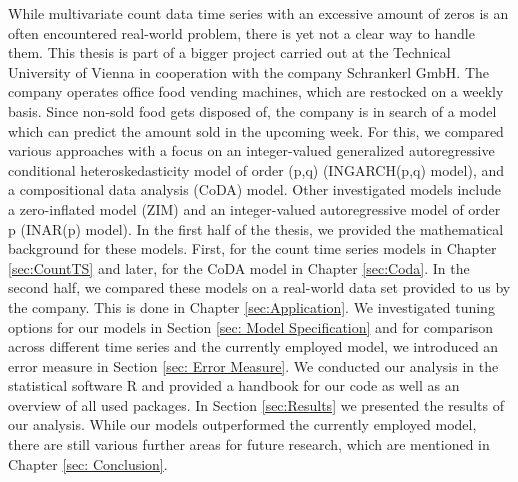 While multivariate count data time series with an excessive amount of zeros is an often encountered real-world problem, there is yet not a clear way to handle them. This thesis is part of a bigger project carried out at the Technical University of Vienna in cooperation with the company Schrankerl GmbH. The company operates office food vending machines, which are restocked on a weekly basis. Since non-sold food gets disposed of, the company is in search of a model which can predict the amount sold in the upcoming week. For this, we compared various approaches with a focus on an integer-valued generalized autoregressive conditional heteroskedasticity model of order (p,q) (INGARCH(p,q) model), and a compositional data analysis (CoDA) model. Other investigated models include a zero-inflated model (ZIM) and an integer-valued autoregressive model of order p (INAR(p) model). In the first half of the thesis, we provided the mathematical background for these models. First, for the count time series models in Chapter \ref{sec:CountTS} and later, for the CoDA model in Chapter \ref{sec:Coda}. In the second half, we compared these models on a real-world data set provided to us by the company. This is done in Chapter \ref{sec:Application}. We investigated tuning options for our models in Section \ref{sec: Model Specification} and for comparison across different time series and the currently employed model, we introduced an error measure in Section \ref{sec: Error Measure}. We conducted our analysis in the statistical software R and provided a handbook for our code as well as an overview of all used packages. In Section \ref{sec:Results} we presented the results of our analysis.  While our models outperformed the currently employed model, there are still various further areas for future research, which are mentioned in Chapter \ref{sec: Conclusion}. 